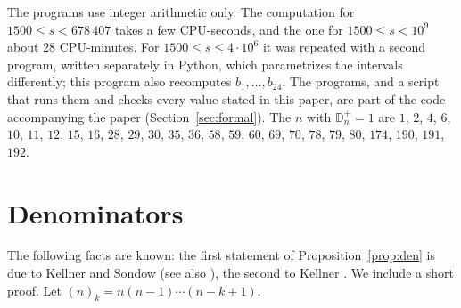 \documentclass[11pt]{amsart}
\theoremstyle{remark}
\numberwithin{equation}{section}
\newcommand{\Dp}{\mathbb D^{+}}
\begin{document}
The programs use integer arithmetic only. The computation for $1500\le s<678\,407$ takes a few CPU-seconds, and the one for
$1500\le s<10^9$ about $28$ CPU-minutes. For $1500\le s\le4\cdot10^6$ it was repeated with a second program, written separately in
Python, which parametrizes the intervals differently; this program also recomputes $b_1,\dots,b_{24}$. The programs, and a script that
runs them and checks every value stated in this paper, are part of the code accompanying the paper (Section~\ref{sec:formal}).
The $n$ with $\Dp_n=1$ are $1$, $2$, $4$, $6$, $10$, $11$, $12$, $15$, $16$, $28$, $29$, $30$, $35$, $36$, $58$, $59$, $60$, $69$,
$70$, $78$, $79$, $80$, $174$, $190$, $191$, $192$.

\section{Denominators}

The following facts are known: the first statement of Proposition~\ref{prop:den} is due to Kellner and Sondow
\cite[Theorems 1 and 2 and (28)]{KS} (see also \cite[Theorem 5]{K17}), the second to Kellner \cite[Theorem 13]{K24}.
We include a short proof. Let $(n)_k=n(n-1)\cdots(n-k+1)$.
\end{document}
